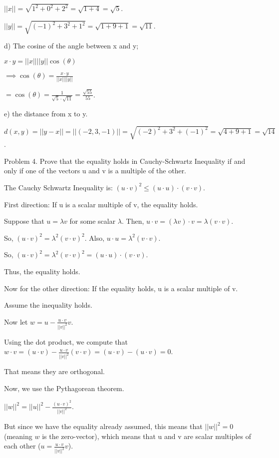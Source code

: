 \documentclass{article}
\begin{document}
$||x|| = \sqrt{1^2 + 0^2 + 2^2} = \sqrt{1 + 4} = \sqrt{5}$.

$||y|| = \sqrt{(-1)^2 + 3^2 + 1^2} = \sqrt{1 + 9 + 1} = \sqrt{11}$.

d) The cosine of the angle between x and y;

$x \cdot y = ||x|| ||y|| \cos(\theta)$

$\implies \cos(\theta) = \frac{x \cdot y}{||x|| ||y||}$

$= \cos(\theta) = \frac{1}{\sqrt{5} \cdot \sqrt{11}} = \frac{\sqrt{55}}{55}$.

e) the distance from x to y.

$d(x, y) = ||y - x|| = ||(-2, 3, -1)|| = \sqrt{(-2)^2 + 3^2 + (-1)^2} = \sqrt{4 + 9 + 1} = \sqrt{14}$.


Problem 4. Prove that the equality holds in Cauchy-Schwartz Inequality if and only if
one of the vectors u and v is a multiple of the other.

The Cauchy Schwartz Inequality is:
$(u \cdot v)^2 \leq (u \cdot u) \cdot (v \cdot v)$.

First direction: If u is a scalar multiple of v, the equality holds.

Suppose that $u = \lambda v$ for some scalar $\lambda$.
Then, $u \cdot v = (\lambda v) \cdot v = \lambda (v \cdot v)$.

So, $(u \cdot v)^2 = \lambda^2 (v \cdot v)^2$. Also, $u \cdot u = \lambda^2 (v \cdot v)$.

So, $(u \cdot v)^2 = \lambda^2 (v \cdot v)^2 = (u \cdot u) \cdot (v \cdot v)$.

Thus, the equality holds.

Now for the other direction: If the equality holds, u is a scalar multiple of v.

Assume the inequality holds.

Now let $w = u - \frac{u \cdot v}{||v||^2} v$.

Using the dot product, we compute that $w \cdot v = (u \cdot v) - \frac{u \cdot v}{||v||^2} (v \cdot v)
= (u \cdot v) - (u \cdot v) = 0$.

That means they are orthogonal.

Now, we use the Pythagorean theorem.

$||w||^2 = ||u||^2 - \frac{(u \cdot v)^2}{||v||^2}$.

But since we have the equality already assumed, this means that $||w||^2 = 0$
(meaning $w$ is the zero-vector), which means that u and v are scalar multiples of each other
($u = \frac{u \cdot v}{||v||^2} v$).
\end{document}
